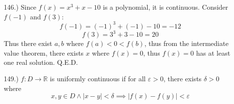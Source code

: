 \documentclass[12pt]{article}
\newcommand{\vertb}[1]{\left\vert#1\right\vert}
\newcommand{\e}{\varepsilon}
\begin{document}
\begin{itemize}

    \item [146.)] Since $f(x)=x^3+x-10$ is a polynomial, it is continuous. Consider $f(-1)$ and $f(3)$:
    \[f(-1)=(-1)^3+(-1)-10=-12\]
    \[f(3)=3^3+3-10=20\]
    Thus there exist $a,b$ where $f(a)<0<f(b)$, thus from the intermediate value theorem, there exists $x$ where $f(x)=0$, thus $f(x)=0$ has at least one real solution. Q.E.D.




    \item [149.)] $f:D\to\mathbb R$ is uniformly continuous if for all $\e>0$, there exists $\delta>0$ where
    \[x,y\in D\land\vertb{x-y}<\delta\implies\vertb{f(x)-f(y)}<\e\]

    



\end{itemize}
\end{document}
